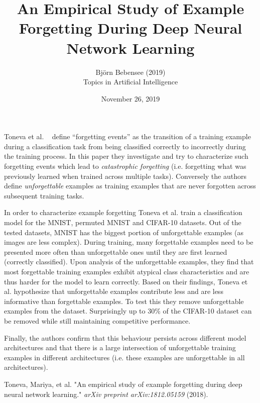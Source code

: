 \documentclass[12pt]{article}
\begin{document}
 
 
\title{An Empirical Study of Example Forgetting During Deep Neural Network Learning}
\author{Bj\"orn Bebensee (2019)\\ %
Topics in Artificial Intelligence}
\date{November 26, 2019}
\maketitle

\noindent
Toneva et al. ~\cite{toneva} define ``forgetting events'' as the transition of a training example during a classification task from being classified correctly to incorrectly during the training process. In this paper they investigate and try to characterize such forgetting events which lead to \emph{catastrophic forgetting} (i.e. forgetting what was previously learned when trained across multiple tasks). Conversely the authors define \emph{unforgettable} examples as training examples that are never forgotten across subsequent training tasks.

In order to characterize example forgetting Toneva et al. train a classification model for the MNIST, permuted MNIST and CIFAR-10 datasets. Out of the tested datasets, MNIST has the biggest portion of unforgettable examples (as images are less complex). During training, many forgettable examples need to be presented more often than unforgettable ones until they are first learned (correctly classified). Upon analysis of the unforgettable examples, they find that most forgettable training examples exhibit atypical class characteristics and are thus harder for the model to learn correctly. Based on their findings, Toneva et al. hypothesize that unforgettable examples contribute less and are less informative than forgettable examples. To test this they remove unforgettable examples from the dataset. Surprisingly up to 30\% of the CIFAR-10 dataset can be removed while still maintaining competitive performance.

Finally, the authors confirm that this behaviour persists across different model architectures and that there is a large intersection of unforgettable training examples in different architectures (i.e. these examples are unforgettable in all architectures). 



\begin{thebibliography}{9}
Toneva, Mariya, et al. "An empirical study of example forgetting during deep neural network learning." \emph{arXiv preprint arXiv:1812.05159} (2018).

\end{thebibliography}
\end{document}
